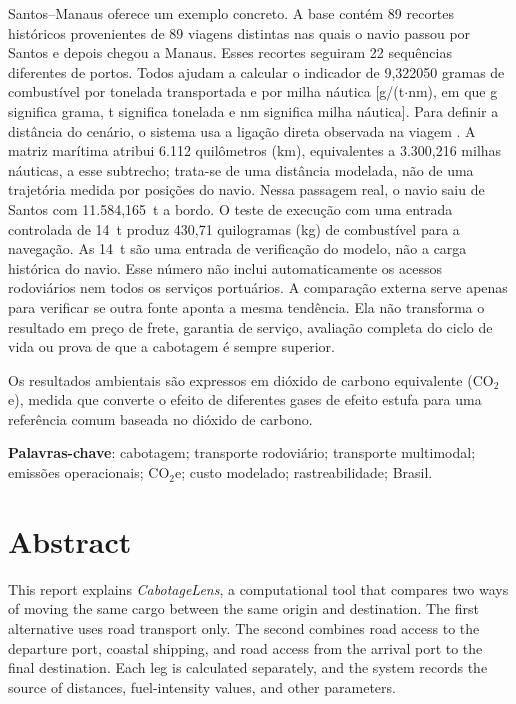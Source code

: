 \documentclass[12pt,a4paper,oneside]{report}
\newcommand{\CabotageLens}{\textit{CabotageLens}}
\newcommand{\cooe}{CO$_2$e}
\newcommand{\codecell}[1]{\texttt{\seqsplit{#1}}}
\begin{document}
Santos--Manaus oferece um exemplo concreto. A base contém 89 recortes históricos provenientes de 89 viagens distintas nas quais o navio passou por Santos e depois chegou a Manaus. Esses recortes seguiram 22 sequências diferentes de portos. Todos ajudam a calcular o indicador de 9,322050 gramas de combustível por tonelada transportada e por milha náutica [g/(t$\cdot$nm), em que g significa grama, t significa tonelada e nm significa milha náutica]. Para definir a distância do cenário, o sistema usa a ligação direta observada na viagem \codecell{voyage\_9612789\_00004}. A matriz marítima atribui 6.112 quilômetros (km), equivalentes a 3.300,216 milhas náuticas, a esse subtrecho; trata-se de uma distância modelada, não de uma trajetória medida por posições do navio. Nessa passagem real, o navio saiu de Santos com 11.584,165~t a bordo. O teste de execução com uma entrada controlada de 14~t produz 430,71 quilogramas (kg) de combustível para a navegação. As 14~t são uma entrada de verificação do modelo, não a carga histórica do navio. Esse número não inclui automaticamente os acessos rodoviários nem todos os serviços portuários. A comparação externa serve apenas para verificar se outra fonte aponta a mesma tendência. Ela não transforma o resultado em preço de frete, garantia de serviço, avaliação completa do ciclo de vida ou prova de que a cabotagem é sempre superior.

Os resultados ambientais são expressos em dióxido de carbono equivalente (\cooe{}), medida que converte o efeito de diferentes gases de efeito estufa para uma referência comum baseada no dióxido de carbono.

\textbf{Palavras-chave}: cabotagem; transporte rodoviário; transporte multimodal; emissões operacionais; \cooe{}; custo modelado; rastreabilidade; Brasil.

\chapter*{Abstract}
This report explains \CabotageLens{}, a computational tool that compares two ways of moving the same cargo between the same origin and destination. The first alternative uses road transport only. The second combines road access to the departure port, coastal shipping, and road access from the arrival port to the final destination. Each leg is calculated separately, and the system records the source of distances, fuel-intensity values, and other parameters.
\end{document}
